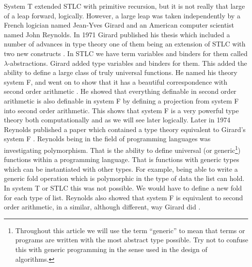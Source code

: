 System T extended STLC with primitive recursion, but it is not really
that large of a leap forward, logically.  However, a large leap was
taken independently by a French logician named Jean-Yves Girard and an
American computer scientist named John Reynolds.  In 1971 Girard
published his thesis which included a number of advances in type
theory one of them being an extension of STLC with two new constructs
\cite{Girard:1971,Girard:1989,Barendregt:1992}.  In STLC we have term
variables and binders for them called $\lambda$-abstractions.  Girard
added type variables and binders for them.  This added the ability to
define a large class of truly universal functions. He named his theory
system F, and went on to show that it has a beautiful correspondence
with second order arithmetic \cite{Wadler:2007}.  He showed that
everything definable in second order arithmetic is also definable in
system F by defining a projection from system F into second order
arithmetic.  This shows that system F is a very powerful type theory
both computationally and as we will see later logically.  Later in
1974 Reynolds published a paper which contained a type theory
equivalent to Girard's system F \cite{Reynolds:1974,Reynolds:1998}.
Reynolds being in the field of programming languages was investigating
polymorphism.  That is the ability to define universal (or
generic\footnote{ Throughout this article we will use the term
  ``generic'' to mean that terms or programs are written with the most
  abstract type possible.  Try not to confuse this with generic
  programming in the sense used in the design of algorithms.})
functions within a programming language.  That is functions with
generic types which can be instantiated with other types. For example,
being able to write a generic fold operation which is polymorphic in
the type of data the list can hold.  In system T or STLC this was not
possible.  We would have to define a new fold for each type of list.
Reynolds also showed that system F is equivalent to second order
arithmetic, in a similar, although different, way Girard did
\cite{Wadler:2007}.

